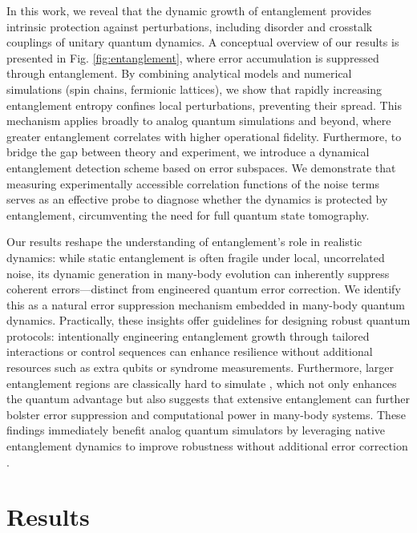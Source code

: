 \documentclass[12pt]{article}
\begin{document}
In this work, we reveal that the dynamic growth of entanglement provides intrinsic protection against perturbations, including disorder and crosstalk couplings of unitary quantum dynamics. A conceptual overview of our results is presented in Fig. \ref{fig:entanglement}, where error accumulation is suppressed through entanglement.
By combining analytical models and numerical simulations (spin chains, fermionic lattices), we show that rapidly increasing entanglement entropy confines local perturbations, preventing their spread. This mechanism applies broadly to analog quantum simulations and beyond, where greater entanglement correlates with higher operational fidelity.
Furthermore, to bridge the gap between theory and experiment, we introduce a dynamical entanglement detection scheme based on error subspaces. We demonstrate that measuring experimentally accessible correlation functions of the noise terms serves as an effective probe to diagnose whether the dynamics is protected by entanglement, circumventing the need for full quantum state tomography.


 


Our results reshape the understanding of entanglement's role in realistic dynamics: while static entanglement is often fragile under local, uncorrelated noise, its dynamic generation in many-body evolution can inherently suppress coherent errors---distinct from engineered quantum error correction. We identify this as a natural error suppression mechanism embedded in many-body quantum dynamics. Practically, these insights offer guidelines for designing robust quantum protocols: intentionally engineering entanglement growth through tailored interactions or control sequences can enhance resilience without additional resources such as extra qubits or syndrome measurements.
Furthermore, larger entanglement regions are classically hard to simulate \cite{cirac2021matrix,orus2019tensor}, which not only enhances the quantum advantage but also suggests that extensive entanglement can further bolster error suppression and computational power in many-body systems. These findings immediately benefit analog quantum simulators by leveraging native entanglement dynamics to improve robustness without additional error correction \cite{mcewen2021removing,harrington2025synchronous}.\\





\section*{Results}
\end{document}
